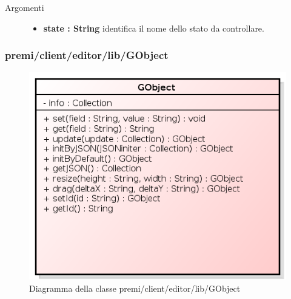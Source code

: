 \begin{description}
\begin{description}
		\begin{description}
			\item[Argomenti] \hfill
				\begin{itemize}
				
					\item \textbf{state : String			} \hfill
					identifica il nome dello stato da controllare.
					
				\end{itemize}
		\end{description}
	\end{description}
		
\end{description}


\subsubsection{premi/client/editor/lib/GObject}
\begin{figure}[H]
\begin{center}
\includegraphics[scale=0.80]{img/diacla/GObject.png}
\caption{Diagramma della classe premi/client/editor/lib/GObject}
\end{center}
\end{figure}

